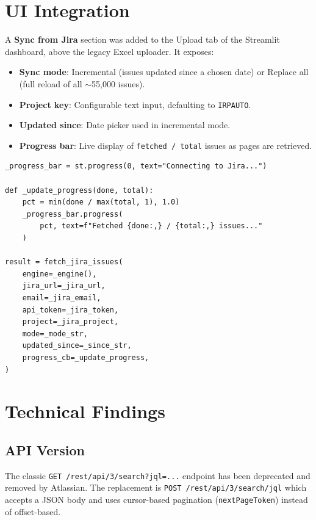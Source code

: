 \documentclass[12pt, a4paper]{article}
\begin{document}
\section{UI Integration}

A \textbf{Sync from Jira} section was added to the Upload tab of the Streamlit dashboard,
above the legacy Excel uploader. It exposes:

\begin{itemize}
    \item \textbf{Sync mode}: Incremental (issues updated since a chosen date) or
          Replace all (full reload of all $\sim$55,000 issues).
    \item \textbf{Project key}: Configurable text input, defaulting to \texttt{IRPAUTO}.
    \item \textbf{Updated since}: Date picker used in incremental mode.
    \item \textbf{Progress bar}: Live display of \texttt{fetched / total} issues as pages
          are retrieved.
\end{itemize}

\begin{lstlisting}[style=python, caption={Progress callback wired to Streamlit}]
_progress_bar = st.progress(0, text="Connecting to Jira...")

def _update_progress(done, total):
    pct = min(done / max(total, 1), 1.0)
    _progress_bar.progress(
        pct, text=f"Fetched {done:,} / {total:,} issues..."
    )

result = fetch_jira_issues(
    engine=_engine(),
    jira_url=_jira_url,
    email=_jira_email,
    api_token=_jira_token,
    project=_jira_project,
    mode=_mode_str,
    updated_since=_since_str,
    progress_cb=_update_progress,
)
\end{lstlisting}

\section{Technical Findings}

\subsection{API Version}

The classic \texttt{GET /rest/api/3/search?jql=...} endpoint has been deprecated and removed
by Atlassian. The replacement is \texttt{POST /rest/api/3/search/jql} which accepts a JSON
body and uses cursor-based pagination (\texttt{nextPageToken}) instead of offset-based.
\end{document}

